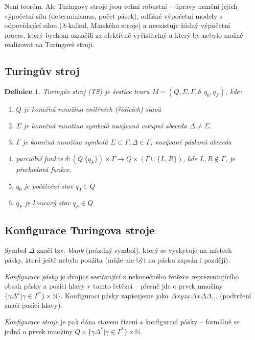 \documentclass[a4paper, 11pt]{report}
\newtheorem{mydef}{Definice}[chapter]
\begin{document}
Není teorém. Ale Turingovy stroje jsou velmi robustní -- úpravy nemění jejich výpočetní sílu (determinismus, počet pásek), odlišné výpočetní modely s odpovídající silou ($\lambda$-kalkul, Minského stroje) a neexistuje žádný výpočetní proces, který bychom označili za efektivně vyčíslitelný a který by nebylo možné realizovat na Turingově stroji.

\subsection{Turingův stroj}

\begin{mydef}
Turingův stroj (TS) je šestice tvaru $M = (Q, \Sigma, \Gamma, \delta, q_0, q_F)$, kde:
\begin{enumerate}
	\item $Q$ je konečná množina vnitřních (řídicích) stavů
	\item $\Sigma$ je konečná množina symbolů nazývaná vstupní abeceda $\Delta \not= \Sigma$.
	\item $\Gamma$ je konečná množina symbolů $\Sigma \subset \Gamma, \Delta \in \Gamma$, nazývané pásková abeceda
	\item parciální funkce $\delta: (Q \ \{q_F\}) \times \Gamma \to Q \times (\Gamma \cup \{L,R\})$, kde $L, R \not\in \Gamma$, je přechodová funkce.
	\item $q_0$ je počáteční stav $q_0 \in Q$
	\item $q_F$ je koncový stav $q_F \in Q$
\end{enumerate}
\end{mydef}

\subsection{Konfigurace Turingova stroje}
Symbol $\Delta$ značí tzv. \emph{blank} (prázdný symbol), který se vyskytuje na místech pásky, která ještě nebyla použita (může ale být na pásku zapsán i později).

\emph{Konfigurace pásky} je dvojice sestávající z nekonečného řetězce reprezentujícího obsah pásky a pozici hlavy v tomto řetězci -- přesně jde o prvek množiny $\{\gamma \Delta^\omega | \gamma \in \Gamma^*\} \times \mathbb{N}\}$. Konfiguraci pásky zapisujeme jako $\Delta x y z \underline{x} \Delta x \Delta \Delta \dots$ (podtržení značí pozici hlavy).

\emph{Konfigurace stroje} je pak dána stavem řízení a konfigurací pásky -- formálně se jedná o prvek množiny $Q \times \{\gamma \Delta^* | \gamma \in \Gamma^*\} \times \mathbb{N}$.
\end{document}
